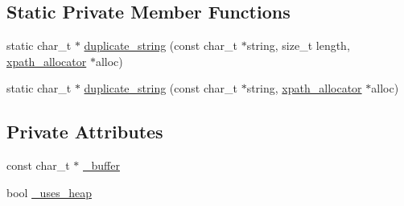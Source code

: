 \subsection*{Static Private Member Functions}
\begin{DoxyCompactItemize}
\item 
static char\_\-t $\ast$ \hyperlink{classxpath__string_a57c53a0b67fecb1845c31215d8ee206b}{duplicate\_\-string} (const char\_\-t $\ast$string, size\_\-t length, \hyperlink{classxpath__allocator}{xpath\_\-allocator} $\ast$alloc)
\item 
static char\_\-t $\ast$ \hyperlink{classxpath__string_a8e1458ed23ff94c0c27f8eb96fb26b11}{duplicate\_\-string} (const char\_\-t $\ast$string, \hyperlink{classxpath__allocator}{xpath\_\-allocator} $\ast$alloc)
\end{DoxyCompactItemize}
\subsection*{Private Attributes}
\begin{DoxyCompactItemize}
\item 
const char\_\-t $\ast$ \hyperlink{classxpath__string_ad52a80412797ca64bbd1bff527e9d666}{\_\-buffer}
\item 
bool \hyperlink{classxpath__string_a67a86f6d1a9cf20b922fc9fb1268d4c1}{\_\-uses\_\-heap}
\end{DoxyCompactItemize}


